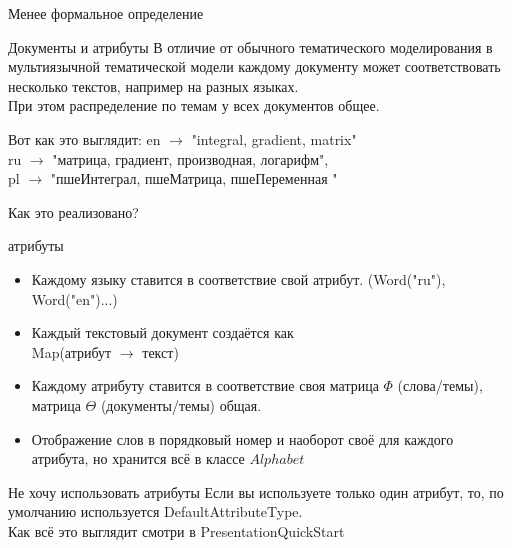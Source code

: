 \documentclass{beamer}
\begin{document}
\begin{frame}{Менее формальное определение}
    \begin{block}{Документы и атрибуты}
	В отличие от обычного тематического моделирования в мультиязычной тематической модели каждому документу может соответствовать несколько текстов, например на разных языках.\\
	При этом распределение по темам у всех документов общее. 
	
    \end{block}

    \begin{block}{Вот как это выглядит:}
	en $\to$ "integral, gradient, matrix" \\ ru $\to$ "матрица, градиент, производная, логарифм", \\ pl $\to$ "пшеИнтеграл, пшеМатрица, пшеПеременная "
    \end{block}
\end{frame}


\begin{frame}{Как это реализовано?}
    \begin{block}{атрибуты}
	\begin{itemize}
	    \item Каждому языку ставится в соответствие свой атрибут. (Word("ru"), Word("en")...)
	    \item Каждый текстовый документ создаётся как\\ Map(атрибут $\to$ текст)
	    \item Каждому атрибуту ставится в соответствие своя матрица $\Phi$ (слова/темы), матрица $\Theta$ (документы/темы) общая. 
	    \item Отображение слов в порядковый номер и наоборот своё для каждого атрибута, но хранится всё в классе $Alphabet$
	\end{itemize}
    \end{block}

    \begin{block}{Не хочу использовать атрибуты}
	Если вы используете только один атрибут, то, по умолчанию используется DefaultAttributeType. \\
	Как всё это выглядит смотри в PresentationQuickStart
    \end{block}
\end{frame}
\end{document}
